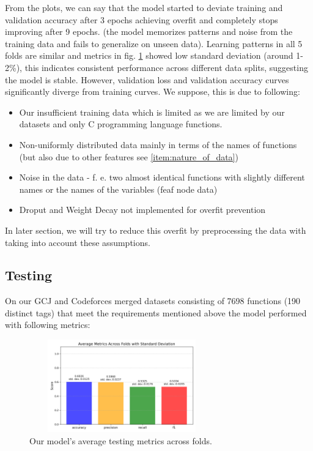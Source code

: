 \documentclass[10pt,english,a4paper]{report}
\begin{document}
From the plots, we can say that the model started to deviate training and 
validation accuracy after 3 epochs achieving overfit and completely stops improving after 9 epochs.
(the model memorizes patterns and noise from the training data and fails to generalize on unseen data).
Learning patterns in all 5 folds are similar and metrics in fig. \ref{fig:average_testing_metrics}
showed low standard deviation (around 1-2\%), this indicates consistent
performance across different data splits, suggesting the model is stable.
However, validation loss and validation accuracy curves significantly diverge from
training curves. We suppose, this is due to following:
\begin{itemize}

\item Our insufficient training data which is limited as we are limited by our datasets and only C programming language functions.
\item Non-uniformly distributed data mainly in terms of the names of functions (but also due to other features see \ref{item:nature_of_data})
\item Noise in the data - f. e. two almost identical functions with slightly different names or the names of the variables (feaf node data)
\item Droput and Weight Decay not implemented for overfit prevention


\end{itemize}

In later section, we will try to reduce this overfit by preprocessing the data 
with taking into account these assumptions.

\subsection{Testing}
On our GCJ and Codeforces merged datasets consisting of 7698 functions (190 distinct tags) that 
meet the requirements mentioned above the model performed with following metrics:

\begin{figure}[H]
    \centering
    \includegraphics[width=8cm, height=4cm]{figures/testing/agg_average_metrics_plot.png}
    \caption{Our model's average testing metrics across folds.}
    \label{fig:average_testing_metrics}
\end{figure}
\end{document}
